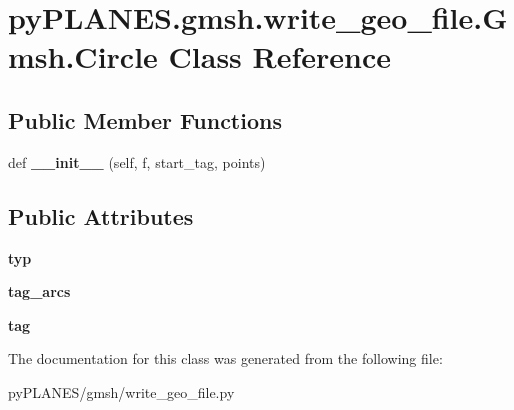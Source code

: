 \hypertarget{classpy_p_l_a_n_e_s_1_1gmsh_1_1write__geo__file_1_1_gmsh_1_1_circle}{}\section{py\+P\+L\+A\+N\+E\+S.\+gmsh.\+write\+\_\+geo\+\_\+file.\+Gmsh.\+Circle Class Reference}
\label{classpy_p_l_a_n_e_s_1_1gmsh_1_1write__geo__file_1_1_gmsh_1_1_circle}
\subsection*{Public Member Functions}
\begin{DoxyCompactItemize}
\item 
\mbox{\label{classpy_p_l_a_n_e_s_1_1gmsh_1_1write__geo__file_1_1_gmsh_1_1_circle_a0d91ac9d9c3d8ae0bb80fdb4dcf7cbe9}} 
def {\bfseries \+\_\+\+\_\+init\+\_\+\+\_\+} (self, f, start\+\_\+tag, points)
\end{DoxyCompactItemize}
\subsection*{Public Attributes}
\begin{DoxyCompactItemize}
\item 
\mbox{\label{classpy_p_l_a_n_e_s_1_1gmsh_1_1write__geo__file_1_1_gmsh_1_1_circle_a8457b824009b1c48a49f446bb9565160}} 
{\bfseries typ}
\item 
\mbox{\label{classpy_p_l_a_n_e_s_1_1gmsh_1_1write__geo__file_1_1_gmsh_1_1_circle_a151ae52a8b4f9842af85bb6a209aa134}} 
{\bfseries tag\+\_\+arcs}
\item 
\mbox{\label{classpy_p_l_a_n_e_s_1_1gmsh_1_1write__geo__file_1_1_gmsh_1_1_circle_ac540be9bc92c1c0f986c5524878a69c0}} 
{\bfseries tag}
\end{DoxyCompactItemize}


The documentation for this class was generated from the following file\+:\begin{DoxyCompactItemize}
\item 
py\+P\+L\+A\+N\+E\+S/gmsh/write\+\_\+geo\+\_\+file.\+py\end{DoxyCompactItemize}
